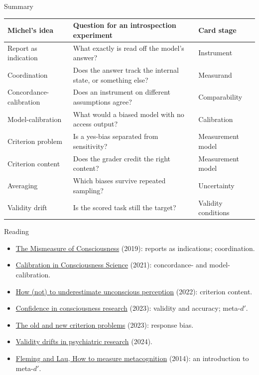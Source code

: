 \documentclass[aspectratio=169,11pt]{beamer}
\begin{document}
\begin{frame}[label=summary]{Summary}
\begin{center}
{\footnotesize\renewcommand{\arraystretch}{1.05}
\begin{tabular}{p{3.4cm}p{6.8cm}p{3.2cm}}
\toprule
\textbf{Michel's idea} & \textbf{Question for an introspection experiment} & \textbf{Card stage} \\
\midrule
Report as indication & What exactly is read off the model's answer? & Instrument \\
Coordination & Does the answer track the internal state, or something else? & Measurand \\
Concordance-calibration & Does an instrument on different assumptions agree? & Comparability \\
Model-calibration & What would a biased model with no access output? & Calibration \\
Criterion problem & Is a yes-bias separated from sensitivity? & Measurement model \\
Criterion content & Does the grader credit the right content? & Measurement model \\
Averaging & Which biases survive repeated sampling? & Uncertainty \\
Validity drift & Is the scored task still the target? & Validity conditions \\
\bottomrule
\end{tabular}
}
\end{center}
\end{frame}

\begin{frame}[label=reading]{Reading}
\small
\begin{itemize}
  \item \href{https://philpapers.org/archive/MICTMO-15.pdf}{The Mismeasure of Consciousness} (2019): reports as indications; coordination.
  \item \href{https://philpapers.org/archive/MICCIC-2.pdf}{Calibration in Consciousness Science} (2021): concordance- and model-calibration.
  \item \href{https://philpapers.org/archive/MICHNT.pdf}{How (not) to underestimate unconscious perception} (2022): criterion content.
  \item \href{https://philarchive.org/archive/MICCIC-3}{Confidence in consciousness research} (2023): validity and accuracy; meta-$d'$.
  \item \href{https://philpapers.org/archive/MICTOA-2.pdf}{The old and new criterion problems} (2023): response bias.
  \item \href{https://580d4178-4a2a-40ee-b753-91905f0859e6.filesusr.com/ugd/b898ea_5e898d22d16b4ba89c07c379485770ed.pdf}{Validity drifts in psychiatric research} (2024).
  \item \href{https://www.frontiersin.org/articles/10.3389/fnhum.2014.00443/pdf}{Fleming and Lau, How to measure metacognition} (2014): an introduction to meta-$d'$.
\end{itemize}
\end{frame}
\end{document}
